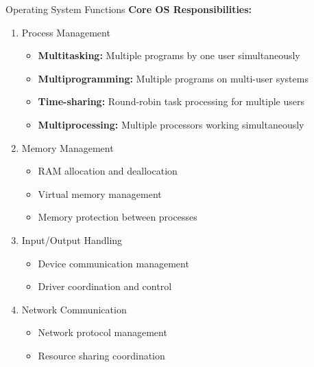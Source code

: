 \documentclass[aspectratio=169]{beamer}
\begin{document}
\begin{frame}{Operating System Functions}
    \textbf{Core OS Responsibilities:}
    
    \begin{enumerate}
        \item Process Management
        \begin{itemize}
            \item \textbf{Multitasking:} Multiple programs by one user simultaneously
            \item \textbf{Multiprogramming:} Multiple programs on multi-user systems
            \item \textbf{Time-sharing:} Round-robin task processing for multiple users
            \item \textbf{Multiprocessing:} Multiple processors working simultaneously
        \end{itemize}
        
        \item Memory Management
        \begin{itemize}
            \item RAM allocation and deallocation
            \item Virtual memory management
            \item Memory protection between processes
        \end{itemize}
        
        \item Input/Output Handling
        \begin{itemize}
            \item Device communication management
            \item Driver coordination and control
        \end{itemize}
        
        \item Network Communication
        \begin{itemize}
            \item Network protocol management
            \item Resource sharing coordination
        \end{itemize}
    \end{enumerate}
\end{frame}
\end{document}
